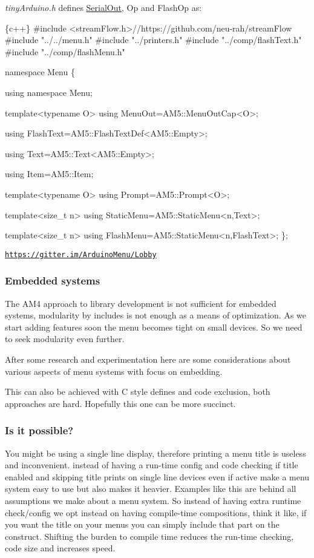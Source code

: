 {\itshape tiny\+Arduino.\+h} defines {\ttfamily \hyperlink{structSerialOut}{Serial\+Out}}, {\ttfamily Op} and {\ttfamily Flash\+Op} as\+: 
\begin{DoxyCode}
\{c++\}
#include <streamFlow.h>//https://github.com/neu-rah/streamFlow
#include "../../menu.h"
#include "../printers.h"
#include "../comp/flashText.h"
#include "../comp/flashMenu.h"

namespace Menu \{

  using namespace Menu;

  template<typename O>
  using MenuOut=AM5::MenuOutCap<O>;

  using FlashText=AM5::FlashTextDef<AM5::Empty>;

  using Text=AM5::Text<AM5::Empty>;

  using Item=AM5::Item;

  template<typename O>
  using Prompt=AM5::Prompt<O>;

  template<size\_t n>
  using StaticMenu=AM5::StaticMenu<n,Text>;

  template<size\_t n>
  using FlashMenu=AM5::StaticMenu<n,FlashText>;
\};
\end{DoxyCode}


\href{https://gitter.im/ArduinoMenu/Lobby}{\tt https\+://gitter.\+im/\+Arduino\+Menu/\+Lobby}

\subsubsection*{Embedded systems}

The A\+M4 approach to library development is not sufficient for embedded systems, modularity by includes is not enough as a means of optimization. As we start adding features soon the menu becomes tight on small devices. So we need to seek modularity even further.

After some research and experimentation here are some considerations about various aspects of menu systems with focus on embedding.

This can also be achieved with C style defines and code exclusion, both approaches are hard. Hopefully this one can be more succinct.

\subsubsection*{Is it possible?}

You might be using a single line display, therefore printing a menu title is useless and inconvenient. instead of having a run-\/time config and code checking if title enabled and skipping title prints on single line devices even if active make a menu system easy to use but also makes it heavier. Examples like this are behind all assumptions we make about a menu system. So instead of having extra runtime check/config we opt instead on having compile-\/time compositions, think it like, if you want the title on your menus you can simply include that part on the construct. Shifting the burden to compile time reduces the run-\/time checking, code size and increases speed.

